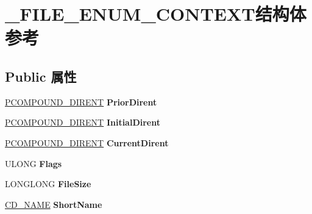 \hypertarget{struct___f_i_l_e___e_n_u_m___c_o_n_t_e_x_t}{}\section{\+\_\+\+F\+I\+L\+E\+\_\+\+E\+N\+U\+M\+\_\+\+C\+O\+N\+T\+E\+X\+T结构体 参考}
\label{struct___f_i_l_e___e_n_u_m___c_o_n_t_e_x_t}
\subsection*{Public 属性}
\begin{DoxyCompactItemize}
\item 
\mbox{\label{struct___f_i_l_e___e_n_u_m___c_o_n_t_e_x_t_addd512e5cbf0d432213fc8c43f172d8e}} 
\hyperlink{struct___c_o_m_p_o_u_n_d___d_i_r_e_n_t}{P\+C\+O\+M\+P\+O\+U\+N\+D\+\_\+\+D\+I\+R\+E\+NT} {\bfseries Prior\+Dirent}
\item 
\mbox{\label{struct___f_i_l_e___e_n_u_m___c_o_n_t_e_x_t_a2fbec5725370ef1b030d97fe6655c167}} 
\hyperlink{struct___c_o_m_p_o_u_n_d___d_i_r_e_n_t}{P\+C\+O\+M\+P\+O\+U\+N\+D\+\_\+\+D\+I\+R\+E\+NT} {\bfseries Initial\+Dirent}
\item 
\mbox{\label{struct___f_i_l_e___e_n_u_m___c_o_n_t_e_x_t_ad2ba62e083d22a9385044bbe95d5f384}} 
\hyperlink{struct___c_o_m_p_o_u_n_d___d_i_r_e_n_t}{P\+C\+O\+M\+P\+O\+U\+N\+D\+\_\+\+D\+I\+R\+E\+NT} {\bfseries Current\+Dirent}
\item 
\mbox{\label{struct___f_i_l_e___e_n_u_m___c_o_n_t_e_x_t_af443f8f6d6a4930eb07960c34e104a2d}} 
U\+L\+O\+NG {\bfseries Flags}
\item 
\mbox{\label{struct___f_i_l_e___e_n_u_m___c_o_n_t_e_x_t_a6986d48775f33b741b3ba584ba3367df}} 
L\+O\+N\+G\+L\+O\+NG {\bfseries File\+Size}
\item 
\mbox{\label{struct___f_i_l_e___e_n_u_m___c_o_n_t_e_x_t_a8416ff875f4d0c8435fbd579768e63ec}} 
\hyperlink{struct___c_d___n_a_m_e}{C\+D\+\_\+\+N\+A\+ME} {\bfseries Short\+Name}

\end{DoxyCompactItemize}
